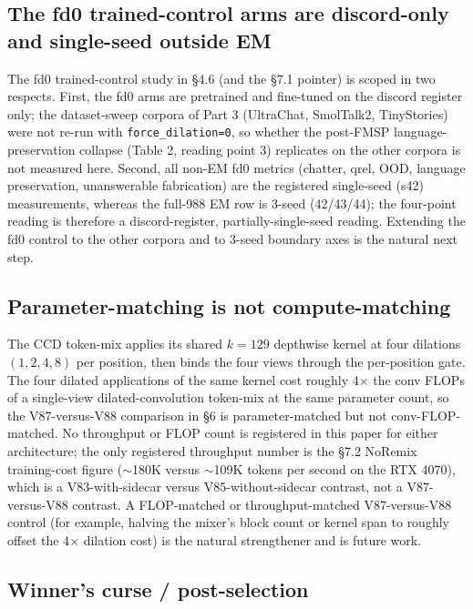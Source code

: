 \documentclass[11pt]{article}
\begin{document}
\subsection{The fd0 trained-control arms are discord-only and single-seed outside EM}

The fd0 trained-control study in \S4.6 (and the \S7.1 pointer) is scoped in two respects. First, the fd0 arms are pretrained and fine-tuned on the discord register only; the dataset-sweep corpora of Part 3 (UltraChat, SmolTalk2, TinyStories) were not re-run with \texttt{force\_dilation=0}, so whether the post-FMSP language-preservation collapse (Table 2, reading point 3) replicates on the other corpora is not measured here. Second, all non-EM fd0 metrics (chatter, qrel, OOD, language preservation, unanswerable fabrication) are the registered single-seed (s42) measurements, whereas the full-988 EM row is 3-seed (42/43/44); the four-point reading is therefore a discord-register, partially-single-seed reading. Extending the fd0 control to the other corpora and to 3-seed boundary axes is the natural next step.

\subsection{Parameter-matching is not compute-matching}

The CCD token-mix applies its shared $k=129$ depthwise kernel at four dilations $(1, 2, 4, 8)$ per position, then binds the four views through the per-position gate. The four dilated applications of the same kernel cost roughly 4$\times$ the conv FLOPs of a single-view dilated-convolution token-mix at the same parameter count, so the V87-versus-V88 comparison in \S6 is parameter-matched but not conv-FLOP-matched. No throughput or FLOP count is registered in this paper for either architecture; the only registered throughput number is the \S7.2 NoRemix training-cost figure ($\sim$180K versus $\sim$109K tokens per second on the RTX 4070), which is a V83-with-sidecar versus V85-without-sidecar contrast, not a V87-versus-V88 contrast. A FLOP-matched or throughput-matched V87-versus-V88 control (for example, halving the mixer's block count or kernel span to roughly offset the 4$\times$ dilation cost) is the natural strengthener and is future work.

\subsection{Winner's curse / post-selection}
\end{document}
